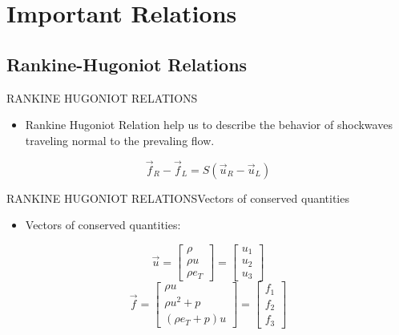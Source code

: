 \documentclass{beamer}
\begin{document}
\section{Important Relations}

\subsection{Rankine-Hugoniot Relations}

\begin{frame}{RANKINE HUGONIOT RELATIONS}
  \begin{itemize}
   \item Rankine Hugoniot Relation help us to describe the behavior of shockwaves traveling normal to the prevaling flow.
  \end{itemize}
  \begin{equation}
   \vec{f}_R-\vec{f}_L=S(\vec{u}_R-\vec{u}_L)
  \end{equation}
\end{frame}

\begin{frame}{RANKINE HUGONIOT RELATIONS}{Vectors of conserved quantities}
  \begin{itemize}
   \item Vectors of conserved quantities:
  \end{itemize}
  \begin{equation}
    \vec{u} = \begin{bmatrix}
      {\rho} \\
      {\rho}{u} \\
      {\rho}{e_T}
    \end{bmatrix}=\begin{bmatrix}
      u_1\\ 
      u_2\\ 
      u_3
      \end{bmatrix}
  \end{equation}
  \begin{equation}
   \vec{f} = \begin{bmatrix}
      {\rho}{u} \\
      {\rho}{u^2}+p \\
      ({\rho}{e_T}+p)u
    \end{bmatrix}=\begin{bmatrix}
      f_1\\ 
      f_2\\ 
      f_3
      \end{bmatrix}
  \end{equation}
\end{frame}
\end{document}
